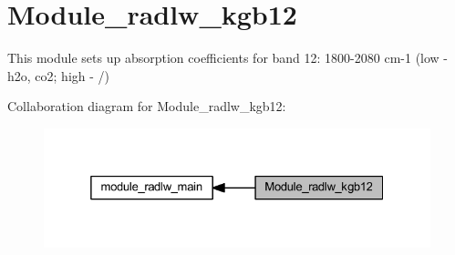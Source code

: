 \hypertarget{group__module__radlw__kgb12}{}\section{Module\+\_\+radlw\+\_\+kgb12}
\label{group__module__radlw__kgb12}


This module sets up absorption coefficients for band 12\+: 1800-\/2080 cm-\/1 (low -\/ h2o, co2; high -\/ /)  


Collaboration diagram for Module\+\_\+radlw\+\_\+kgb12\+:\nopagebreak
\begin{figure}[H]
\begin{center}
\leavevmode
\includegraphics[width=325pt]{group__module__radlw__kgb12}
\end{center}
\end{figure}
